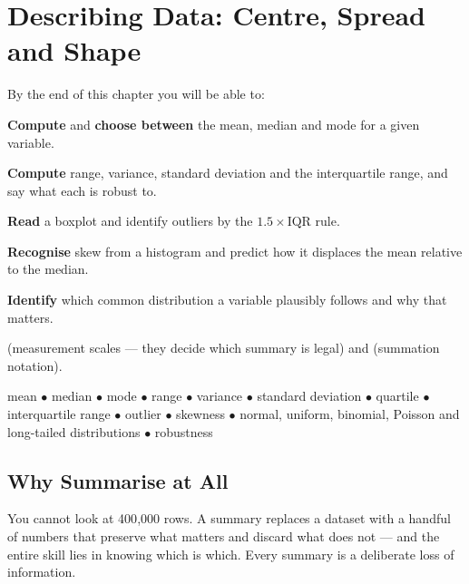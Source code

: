 \chapter{Describing Data: Centre, Spread and Shape}\label{ch:descriptive}

\begin{outcomes}
By the end of this chapter you will be able to:
\begin{tight}
  \item \textbf{Compute} and \textbf{choose between} the mean, median and mode for a given variable.
  \item \textbf{Compute} range, variance, standard deviation and the interquartile range, and say what each is robust to.
  \item \textbf{Read} a boxplot and identify outliers by the $1.5 \times \text{IQR}$ rule.
  \item \textbf{Recognise} skew from a histogram and predict how it displaces the mean relative to the median.
  \item \textbf{Identify} which common distribution a variable plausibly follows and why that matters.
\end{tight}
\end{outcomes}

\begin{prereq}
 (measurement scales --- they decide which summary is legal) and
 (summation notation).
\end{prereq}

\begin{keyterms}
mean $\bullet$ median $\bullet$ mode $\bullet$ range $\bullet$ variance $\bullet$
standard deviation $\bullet$ quartile $\bullet$ interquartile range $\bullet$
outlier $\bullet$ skewness $\bullet$ normal, uniform, binomial, Poisson and
long-tailed distributions $\bullet$ robustness
\end{keyterms}

\section{Why Summarise at All}

You cannot look at 400{,}000 rows. A summary replaces a dataset with a handful of
numbers that preserve what matters and discard what does not --- and the entire
skill lies in knowing which is which. Every summary is a deliberate loss of
information.

